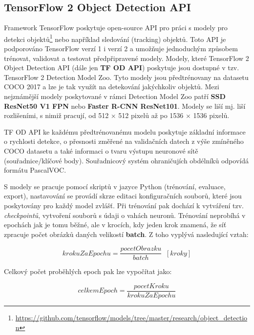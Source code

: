 \subsection*{TensorFlow 2 Object Detection API}
Framework TensorFlow poskytuje open-source API pro práci s modely pro detekci objektů\footnote{\url{https://github.com/tensorflow/models/tree/master/research/object_detection}} nebo například sledování (tracking) objektů. Toto API je podporováno TensorFlow verzí 1 i verzí 2 a umožňuje jednoduchým způsobem trénovat, validovat a testovat předpřipravené modely. Modely, které TensorFlow 2 Object Detection API (dále jen \textbf{TF OD API}) poskytuje jsou dostupné v tzv. TensorFlow 2 Detection Model Zoo. Tyto modely jsou předtrénovany na datasetu COCO 2017 a lze je tak využít na detekování jakýchkoliv objektů. Mezi nejznámější modely poskytované v rámci Detection Model Zoo patří \textbf{SSD ResNet50 V1 FPN} nebo \textbf{Faster R-CNN ResNet101}. Modely se liší mj. liší rozlišeními, s nimiž pracují, od 512 $\times$ 512 pixelů až po 1536 $\times$ 1536 pixelů.

TF OD API ke každému předtrénovanému modelu poskytuje základní informace o rychlosti detekce, o přesnosti změřené na validačních datech z výše zmíněného COCO datasetu a také informaci o tvaru výstupu neuronové sítě (souřadnice/klíčové body). Souřadnicový systém ohraničujích obdélníků odpovídá formátu PascalVOC. 

S modely se pracuje pomocí skriptů v jazyce Python (trénování, evaluace, export), nastavování se provádí skrze editaci konfiguračních souborů, které jsou poskytovány pro každý model zvlášť. Při trénování pak dochází k vytváření tzv. \emph{checkpointů}, vytvoření souborů s údaji o vahách neuronů. Trénování neprobíhá v epochách jak je tomu běžné, ale v krocích, kdy jeden krok znamená, že síť zpracuje počet obrázků daných velikostí \textbf{batch}. Z toho vyplývá nasledující vztah:

\begin{equation}
  \label{vzorec:krokuzaepochu}
  krokuZaEpochu = \frac{pocetObrazku}{batch}  \;\;[kroky]  
\end{equation}

\noindent Celkový počet proběhlých epoch pak lze vypočítat jako:

\begin{equation}
  \label{vzorec:celkemepoch}
  celkemEpoch = \frac{pocetKroku}{krokuZaEpochu}
\end{equation}


